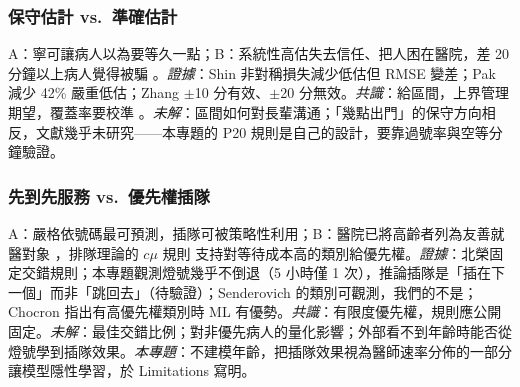 \documentclass[11pt,twocolumn]{article}
\begin{document}
\subsubsection{保守估計 vs.\ 準確估計}
A：寧可讓病人以為要等久一點；B：系統性高估失去信任、把人困在醫院，差 20 分鐘以上病人覺得被騙 \cite{zhang2023}。\textit{證據}：Shin \cite{shin2024} 非對稱損失減少低估但 RMSE 變差；Pak \cite{pak2021} 減少 42\% 嚴重低估；Zhang \cite{zhang2023} $\pm$10 分有效、$\pm$20 分無效。\textit{共識}：給區間，上界管理期望，覆蓋率要校準 \cite{shahbazi2026}。\textit{未解}：區間如何對長輩溝通；「幾點出門」的保守方向相反，文獻幾乎未研究——本專題的 P20 規則是自己的設計，要靠過號率與空等分鐘驗證。

\subsubsection{先到先服務 vs.\ 優先權插隊}
A：嚴格依號碼最可預測，插隊可被策略性利用；B：醫院已將高齡者列為友善就醫對象 \cite{vghtpe2025,vghtcnotice}，排隊理論的 $c\mu$ 規則 \cite{cox1961} 支持對等待成本高的類別給優先權。\textit{證據}：北榮固定交錯規則；本專題觀測燈號幾乎不倒退（5 小時僅 1 次），推論插隊是「插在下一個」而非「跳回去」（待驗證）；Senderovich \cite{senderovich2015} 的類別可觀測，我們的不是；Chocron \cite{chocron2022} 指出有高優先權類別時 ML 有優勢。\textit{共識}：有限度優先權，規則應公開固定。\textit{未解}：最佳交錯比例；對非優先病人的量化影響；外部看不到年齡時能否從燈號學到插隊效果。\textit{本專題}：不建模年齡，把插隊效果視為醫師速率分佈的一部分讓模型隱性學習，於 Limitations 寫明。
\end{document}
